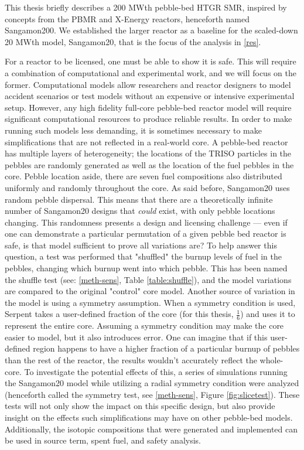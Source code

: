 This thesis briefly describes a 200 MWth pebble-bed HTGR SMR, inspired by concepts from the PBMR \cite{venter_pbmr_2005, noauthor_pebble_2017} and X-Energy \cite{harlan_x-energy_2018} reactors, henceforth named Sangamon200.  We established the larger reactor as a baseline for the scaled-down 20 MWth model, Sangamon20, that is the focus of the analysis in \autoref{res}.

For a reactor to be licensed, one must be able to show it is safe.  This will require a combination of computational and experimental work, and we will focus on the former.  Computational models allow researchers and reactor designers to model accident scenarios or test models without an expensive or intensive experimental setup. However, any high fidelity full-core pebble-bed reactor model will require significant computational resources to produce reliable results.  In order to make running such models less demanding, it is sometimes necessary to make simplifications that are not reflected in a real-world core.  A pebble-bed reactor has multiple layers of heterogeneity; the locations of the TRISO particles in the pebbles are randomly generated as well as the location of the fuel pebbles in the core.  Pebble location aside, there are seven fuel compositions also distributed uniformly and randomly throughout the core.  As said before, Sangamon20 uses random pebble dispersal.  This means that there are a theoretically infinite number of Sangamon20 designs that \emph{could} exist, with only pebble locations changing.  This randomness presents a design and licensing challenge --- even if one can demonstrate a particular permutation of a given pebble bed reactor is safe, is that model sufficient to prove all variations are?  To help answer this question, a test was performed that "shuffled" the burnup levels of fuel in the pebbles, changing which burnup went into which pebble.  This has been named the shuffle test (see: \autoref{meth-sens}, Table \ref{table:shuffle}), and the model variations are compared to the original "control" core model.  Another source of variation in the model is using a symmetry assumption.  When a symmetry condition is used, Serpent takes a user-defined fraction of the core (for this thesis, $\frac{1}{6}$) and uses it to represent the entire core.  Assuming a symmetry condition may make the core easier to model, but it also introduces error.  One can imagine that if this user-defined region happens to have a higher fraction of a particular burnup of pebbles than the rest of the reactor, the results wouldn't accurately reflect the whole-core.  To investigate the potential effects of this, a series of simulations running the Sangamon20 model while utilizing a radial symmetry condition were analyzed (henceforth called the symmetry test, see \autoref{meth-sens}, Figure \ref{fig:slicetest}).  These tests will not only show the impact on this specific design, but also provide insight on the effects such simplifications may have on other pebble-bed models.  Additionally, the isotopic compositions that were generated and implemented can be used in source term, spent fuel, and safety analysis.

